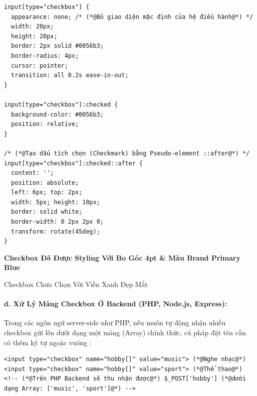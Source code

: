 \begin{codeWindow}
\begin{lstlisting}[language=HTML5]
input[type="checkbox"] {
  appearance: none; /* (*@Bỏ giao diện mặc định của hệ điều hành@*) */
  width: 20px;
  height: 20px;
  border: 2px solid #0056b3;
  border-radius: 4px;
  cursor: pointer;
  transition: all 0.2s ease-in-out;
}

input[type="checkbox"]:checked {
  background-color: #0056b3;
  position: relative;
}

/* (*@Tạo dấu tích chọn (Checkmark) bằng Pseudo-element ::after@*) */
input[type="checkbox"]:checked::after {
  content: '';
  position: absolute;
  left: 6px; top: 2px;
  width: 5px; height: 10px;
  border: solid white;
  border-width: 0 2px 2px 0;
  transform: rotate(45deg);
}
\end{lstlisting}
\end{codeWindow}

\begin{browserWindow}
\sffamily\small
{} \;\textbf{Checkbox Đã Được Styling Với Bo Góc 4pt \& Màu Brand Primary Blue} \\[5pt]
 \; Checkbox Chưa Chọn Với Viền Xanh Đẹp Mắt
\end{browserWindow}

\paragraph{d. Xử Lý Mảng Checkbox Ở Backend (PHP, Node.js, Express):}
Trong các ngôn ngữ server-side như PHP, nếu muốn tự động nhận nhiều checkbox gửi lên dưới dạng một mảng (Array) chính thức, cú pháp đặt tên  cần có thêm ký tự ngoặc vuông \codeinline{[]}:

\begin{codeWindow}
\begin{lstlisting}[language=HTML5]
<input type="checkbox" name="hobby[]" value="music"> (*@Nghe nhạc@*)
<input type="checkbox" name="hobby[]" value="sport"> (*@Thể thao@*)
<!-- (*@Trên PHP Backend sẽ thu nhận được@*) $_POST['hobby'] (*@dưới dạng Array: ['music', 'sport']@*) -->
\end{lstlisting}
\end{codeWindow}

